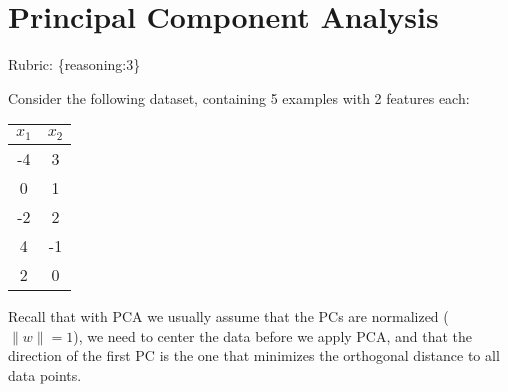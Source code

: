 \documentclass{article}
\def\rubric#1{\gre{Rubric: \{#1\}}}{}
\def\gre#1{{\color{gre}#1}}
\def\norm#1{\|#1\|}
\begin{document}
\section{Principal Component Analysis}
\rubric{reasoning:3}


Consider the following dataset, containing 5 examples with 2 features each:
\begin{center}
\begin{tabular}{cc}
$x_1$ & $x_2$\\
\hline
-4 & 3\\
0 & 1\\
-2 & 2\\
4 & -1\\
2 & 0\\
\end{tabular}
\end{center}
Recall that with PCA we usually assume that the PCs are normalized ($\norm{w} = 1$), we need to center the data before we apply PCA, and that the direction of the first PC is the one that minimizes the orthogonal distance to all data points.
\end{document}
